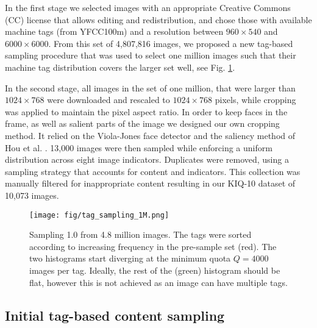 \documentclass{article}
\begin{document}
In the first stage we selected images with an appropriate Creative Commons (CC) license that allows editing and redistribution, and chose those with  available machine tags (from YFCC100m) and a resolution between $960\times540$ and $6000\times6000$. From this set of 4,807,816 images, we proposed a new tag-based sampling procedure that was used to select one million images such that their machine tag distribution covers  the larger set well, see Fig. \ref{fig:tag_sampling}.



In the second stage, all images in the set of one million, that were larger than  $1024\times768$ were downloaded and rescaled to $1024\times768$ pixels, while cropping was applied to maintain the pixel aspect ratio. In order to keep faces in the frame, as well as salient parts of the image we designed our own cropping method. It relied on the Viola-Jones face detector and the saliency method of Hou et al. \cite{hou_image_2012}. 13,000 images were then sampled while enforcing a uniform distribution across eight image indicators. Duplicates were removed, using a sampling strategy that accounts for content and indicators. This collection was manually filtered for inappropriate content resulting in our KIQ-10 dataset of 10,073 images.


\begin{figure}[!t]
\centering
\vspace{-10pt}
\texttt{[image: fig/tag\_sampling\_1M.png]}
\vspace{-5pt}
\caption{Sampling 1.0 from 4.8 million images. The tags were sorted according to increasing frequency in the pre-sample set (red). The two histograms start diverging at the minimum quota $Q=4000$ images per tag. Ideally, the rest of the (green) histogram should be flat, however this is not achieved as an image can have multiple tags.\vspace{-20pt}}
\label{fig:tag_sampling}
\end{figure}

\subsection{Initial tag-based content sampling}
\end{document}
